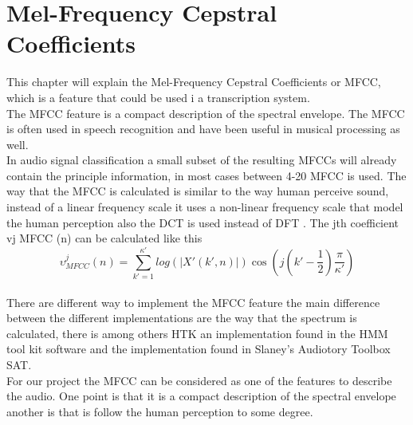 \section{Mel-Frequency Cepstral Coefficients}
This chapter will explain the Mel-Frequency Cepstral Coefficients or MFCC, which is a feature that could be used i a transcription system. \\
The MFCC feature is a compact description of the spectral envelope. The MFCC is often used in speech recognition and have been useful in musical processing as well\citep{ACA}. \\ 
In audio signal classification a small subset of the resulting MFCCs will already contain the principle information, in most cases between 4-20 MFCC is used. The way that the MFCC is calculated is  similar to the way human perceive sound, instead of a linear frequency scale it uses a non-linear frequency scale that model the human perception also the DCT is used instead of DFT \citep{ACA}. The jth coefficient vj  MFCC (n) can be calculated like this\citep{ACA}\\
\begin{equation}\label{ eq:MFCC calculation}
  \upsilon ^j  _{MFCC} (n) = \sum_{k'=1}^{\kappa'} log(\vert X' (k',n) \vert)\cos(j(k' - \frac{1}{2})\frac{\pi}{\kappa'})
\end{equation}
\\
There are different way to implement the MFCC feature the main difference between the different implementations are the way that the spectrum is calculated, there is among others HTK an implementation found in the HMM tool kit software\citep{HTK} and the implementation found in Slaney's Audiotory Toolbox SAT\citep{Slaney}.
\\
For our project the MFCC can be considered as one of the features to describe the audio. One point is that it is a compact description of the spectral envelope another is that is follow the human perception to some degree.
